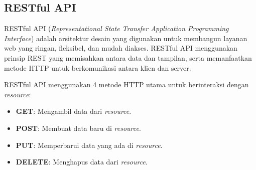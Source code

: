 




\subsection{RESTful API}

RESTful API (\emph{Representational State Transfer Application Programming Interface}) adalah arsitektur desain yang digunakan untuk membangun layanan web yang ringan, fleksibel, dan mudah diakses. RESTful API menggunakan prinsip REST yang memisahkan antara data dan tampilan, serta memanfaatkan metode HTTP untuk berkomunikasi antara klien dan server.

RESTful API menggunakan 4 metode HTTP utama untuk berinteraksi dengan \emph{resource}:
\begin{itemize}[nolistsep]
  \item \textbf{GET}: Mengambil data dari \emph{resource}.
  \item \textbf{POST}: Membuat data baru di \emph{resource}.
  \item \textbf{PUT}: Memperbarui data yang ada di \emph{resource}.
  \item \textbf{DELETE}: Menghapus data dari \emph{resource}.
\end{itemize}

